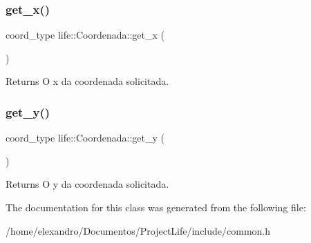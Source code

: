 \subsubsection{get\+\_\+x()}
{\footnotesize\ttfamily coord\+\_\+type life\+::\+Coordenada\+::get\+\_\+x (\begin{DoxyParamCaption}{ }\end{DoxyParamCaption})\hspace{0.3cm}{\ttfamily [inline]}}

\begin{DoxyReturn}{Returns}
O x da coordenada solicitada. 
\end{DoxyReturn}
\mbox{\label{classlife_1_1_coordenada_a9b7093bde062c991ae3271b773a1a814}} 
\subsubsection{get\+\_\+y()}
{\footnotesize\ttfamily coord\+\_\+type life\+::\+Coordenada\+::get\+\_\+y (\begin{DoxyParamCaption}{ }\end{DoxyParamCaption})\hspace{0.3cm}{\ttfamily [inline]}}

\begin{DoxyReturn}{Returns}
O y da coordenada solicitada. 
\end{DoxyReturn}


The documentation for this class was generated from the following file\+:\begin{DoxyCompactItemize}
\item 
/home/elexandro/\+Documentos/\+Project\+Life/include/common.\+h\end{DoxyCompactItemize}
